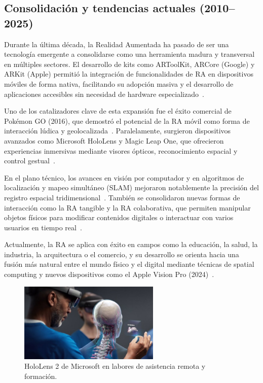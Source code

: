 \subsection{Consolidación y tendencias actuales (2010–2025)}

Durante la última década, la Realidad Aumentada ha pasado de ser una tecnología emergente a consolidarse como una herramienta madura y transversal en múltiples sectores. El desarrollo de kits como ARToolKit, ARCore (Google) y ARKit (Apple) permitió la integración de funcionalidades de RA en dispositivos móviles de forma nativa, facilitando su adopción masiva y el desarrollo de aplicaciones accesibles sin necesidad de hardware especializado~\cite{apple2017,google2018}.

Uno de los catalizadores clave de esta expansión fue el éxito comercial de Pokémon GO (2016), que demostró el potencial de la RA móvil como forma de interacción lúdica y geolocalizada~\cite{paavilainen2017}. Paralelamente, surgieron dispositivos avanzados como Microsoft HoloLens y Magic Leap One, que ofrecieron experiencias inmersivas mediante visores ópticos, reconocimiento espacial y control gestual~\cite{microsoft2016,krevelen2010}.

En el plano técnico, los avances en visión por computador y en algoritmos de localización y mapeo simultáneo (SLAM) mejoraron notablemente la precisión del registro espacial tridimensional~\cite{klein2007}. También se consolidaron nuevas formas de interacción como la RA tangible y la RA colaborativa, que permiten manipular objetos físicos para modificar contenidos digitales o interactuar con varios usuarios en tiempo real~\cite{ishii1997,billinghurst2002}.

Actualmente, la RA se aplica con éxito en campos como la educación, la salud, la industria, la arquitectura o el comercio, y su desarrollo se orienta hacia una fusión más natural entre el mundo físico y el digital mediante técnicas de spatial computing y nuevos dispositivos como el Apple Vision Pro (2024)~\cite{apple2024}.

\begin{figure}[H]
    \centering
    \includegraphics[width=0.6\textwidth]{figs/hololens.jpg}
    \caption{HoloLens 2 de Microsoft en labores de asistencia remota y formación.}
    \label{fig:hololens}
\end{figure}

